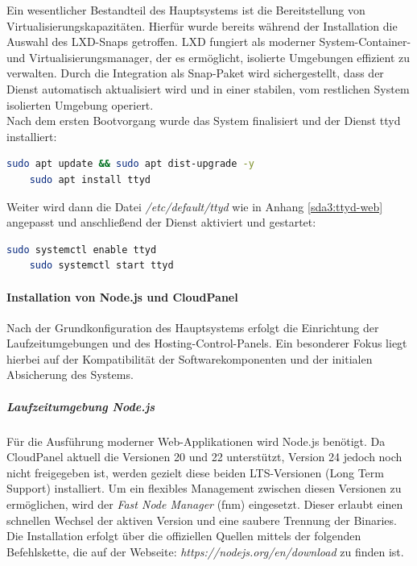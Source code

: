 \documentclass[11pt,
a4paper,
numbers=nonperiod,
footsepline,
oneside,
numbers=noenddot,
bibliography=totoc
]{scrartcl}
\begin{document}
Ein wesentlicher Bestandteil des Hauptsystems ist die Bereitstellung von Virtualisierungskapazitäten. Hierfür wurde bereits während der Installation die Auswahl des LXD-Snaps getroffen. LXD fungiert als moderner System-Container- und Virtualisierungsmanager, der es ermöglicht, isolierte Umgebungen effizient zu verwalten. Durch die Integration als Snap-Paket wird sichergestellt, dass der Dienst automatisch aktualisiert wird und in einer stabilen, vom restlichen System isolierten Umgebung operiert.\\

Nach dem ersten Bootvorgang wurde das System finalisiert und der Dienst ttyd installiert:
\begin{lstlisting}[language=bash]
	sudo apt update && sudo apt dist-upgrade -y
	sudo apt install ttyd
\end{lstlisting}

\bigskip
Weiter wird dann die Datei \emph{/etc/default/ttyd} wie in Anhang \ref{sda3:ttyd-web} angepasst und anschließend der Dienst aktiviert und gestartet:
\begin{lstlisting}[language=bash]
	sudo systemctl enable ttyd
	sudo systemctl start ttyd
\end{lstlisting}

\paragraph{Installation von Node.js und CloudPanel}

Nach der Grundkonfiguration des Hauptsystems erfolgt die Einrichtung der Laufzeitumgebungen und des Hosting-Control-Panels. Ein besonderer Fokus liegt hierbei auf der Kompatibilität der Softwarekomponenten und der initialen Absicherung des Systems.
\newpage
\subparagraph{Laufzeitumgebung Node.js}
Für die Ausführung moderner Web-Applikationen wird Node.js benötigt. Da CloudPanel aktuell die Versionen 20 und 22 unterstützt, Version 24 jedoch noch nicht freigegeben ist, werden gezielt diese beiden LTS-Versionen (Long Term Support) installiert. Um ein flexibles Management zwischen diesen Versionen zu ermöglichen, wird der \textit{Fast Node Manager} (fnm) eingesetzt. Dieser erlaubt einen schnellen Wechsel der aktiven Version und eine saubere Trennung der Binaries.\\

Die Installation erfolgt über die offiziellen Quellen mittels der folgenden Befehlskette, die auf der Webseite: \emph{https://nodejs.org/en/download} \cite{nodejs_install} zu finden ist.
\end{document}
